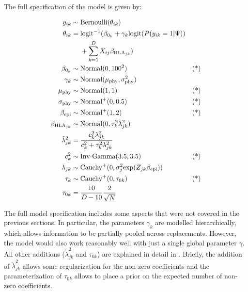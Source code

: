 \documentclass{bioinfo}
\begin{document}
\begin{methods}
The full specification of the model is given by:

\begin{equation}
  \label{eq:full}
  \begin{aligned}
   y_{ik} &\sim \text{Bernoulli}(\theta_{ik}) &\\
   \theta_{ik} &=
        \text{logit}^{-1}(\beta_{0_{k}} + \gamma_{k}\text{logit}(P(y_{ik}=1|\Psi)) & \\
        \hspace{-6cm} &~~~~ +\sum_{k=1}^{D}X_{ij}\beta_{\text{HLA}_{jk}}) & \\
    \beta_{0_{k}} &\sim \text{Normal}(0, 100^2) & \text{(*)}\\
   \gamma_{k} &\sim \text{Normal}(\mu_{\text{phy}}, \sigma_{\text{phy}}^2) & \\
    \mu_{\text{phy}} &\sim \text{Normal}(1, 1) & \text{(*)} \\
   \sigma_{\text{phy}} &\sim \text{Normal}^{+}(0, 0.5) & \text{(*)} \\
   \beta_{\text{epi}} &\sim \text{Normal}^{+}(1, 2) & \text{(*)} \\
   \beta_{\text{HLA}_{jk}} &\sim \text{Normal}(0, \tau_{k}^{2}\tilde{\lambda}^{2}_{jk}) & \\
   \tilde{\lambda}^{2}_{jk} &= \frac{c_{k}^{2}\lambda_{jk}^{2}}{c_{k}^{2} + \tau_{k}^{2}\lambda_{jk}^{2}} & \\
    c_{k}^2 &\sim \text{Inv-Gamma}(3.5, 3.5) & \text{(*)} \\
   \lambda_{jk} &\sim \text{Cauchy}^{+}(0, \sigma_{j}^2\text{exp}(Z_{jk}\beta_{\text{epi}})) & \\
   \tau_{k} &\sim \text{Cauchy}^{+}(0, \tau_{0k}) & \text{(*)} \\
   \tau_{0k} &= \frac{10}{D-10}\frac{2}{\sqrt{N}} & \\
  \end{aligned}
\end{equation}

The full model specification includes some aspects that were not covered in the previous sections. In particular, the parameters \(\gamma_{k}\) are modelled hierarchically, which allows information to be partially pooled across replacements. However, the model would also work reasonably well with just a single global parameter \(\gamma\). All other additions (\(\tilde{\lambda}_{jk}^{2}\) and \(\tau_{0k}\)) are explained in detail in \citep{Piironen2017}. Briefly, the addition of  \(\tilde{\lambda}_{jk}^{2}\) allows some regularization for the non-zero coefficients and the parameterization of \(\tau_{0k}\) allows to place a prior on the expected number of non-zero coefficients.


\end{methods}
\end{document}
